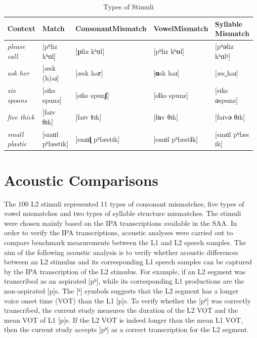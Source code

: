 \begin{table}[!h]
  \figSpace
  \centering
  \caption{Types of Stimuli}
\label{table:tos}
    \begin{tabular}{p{5.2em}llll}
    \toprule
    Context & \multicolumn{1}{p{5.2em}}{Match} & \multicolumn{1}{p{5em}}{Consonant\quad Mismatch} & \multicolumn{1}{p{5em}}{Vowel\quad Mismatch} & \multicolumn{1}{p{5em}}{Syllable Mismatch} \\
    \midrule
    \textit{please call} &[pʰliz kʰɑl] &[\textbf{p}liz kʰɑl]&[pʰliz kʰ\textbf{o}l]&[pʰ\textbf{ə}liz kʰɑlˠ]\\
        \textit{ask her} &[æsk (h)əɹ] &[æsk hə\textbf{r}]&[\textbf{ɑ}sk həɹ]&[æs\underline{ } həɹ]\\
        \textit{six spoons} &[sɪks spunz] &[sɪks spun\textbf{ʃ}]&[s\textbf{i}ks spunz]&[sɪks \textbf{ə}spunz]\\
        \textit{five thick} &[faɪv θɪk]&[faɪv \textbf{t}ɪk] &[f\textbf{a}v θɪk]&[faɪv\textbf{ə} θɪk]\\
        \textit{small plastic} &[smɑl pʰlæstɪk]&[smɑ\textbf{ɭ} pʰlæstɪk]&[smɑl pʰlæst\textbf{i}k]&[smɑl pʰlæs\underline{ }ɪk] \\
    \bottomrule
    \end{tabular}%
    \figSpace
\end{table}%

\section{Acoustic Comparisons}

The 100 L2 stimuli represented 11 types of consonant mismatches, five types of vowel mismatches and two types of syllable structure mismatches. The stimuli were chosen mainly based on the IPA transcriptions available in the SAA. In order to verify the IPA transcriptions, acoustic analyses were carried out to compare benchmark measurements between the L1 and L2 speech samples. The aim of the following acoustic analysis is to verify whether acoustic differences between an L2 stimulus and its corresponding L1 speech samples can be captured by the IPA transcription of the L2 stimulus. For example, if an L2 segment was transcribed as an aspirated [pʰ], while its corresponding L1 productions are the non-aspirated [p]s. The [ʰ] symbols suggests that the L2 segment has a longer voice onset time (VOT) than the L1 [p]s. To verify whether the [pʰ] was correctly transcribed, the current study measures the duration of the L2 VOT and the mean VOT of L1 [p]s. If the L2 VOT is indeed longer than the mean L1 VOT, then the current study accepts [pʰ] as a correct transcription for the L2 segment.  

